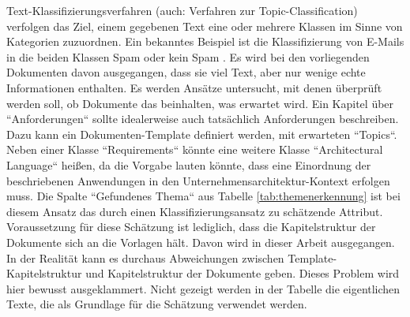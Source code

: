 Text-Klassifizierungsverfahren (auch: Verfahren zur Topic-Classification) verfolgen das Ziel, einem gegebenen Text eine oder mehrere Klassen im Sinne von Kategorien zuzuordnen. Ein bekanntes Beispiel ist die Klassifizierung von E-Mails in die beiden Klassen Spam oder kein Spam \cite{Gupta}. Es wird bei den vorliegenden Dokumenten davon ausgegangen, dass sie viel Text, aber nur wenige echte Informationen enthalten. 
Es werden Ansätze untersucht, mit denen überprüft werden soll, ob Dokumente das beinhalten, was erwartet wird. Ein Kapitel über ``Anforderungen`` sollte idealerweise auch tatsächlich Anforderungen beschreiben.
Dazu kann ein Dokumenten-Template definiert werden, mit erwarteten ``Topics``. Neben einer Klasse ``Requirements`` könnte eine weitere Klasse ``Architectural Language`` heißen, da die Vorgabe lauten könnte, dass eine Einordnung der beschriebenen Anwendungen in den Unternehmensarchitektur-Kontext erfolgen muss. Die Spalte ``Gefundenes Thema`` aus Tabelle \ref{tab:themenerkennung} ist bei diesem Ansatz das durch einen Klassifizierungsansatz zu schätzende Attribut. Voraussetzung für diese Schätzung ist lediglich, dass die Kapitelstruktur der Dokumente sich an die Vorlagen hält. Davon wird in dieser Arbeit ausgegangen. In der Realität kann es durchaus Abweichungen zwischen Template-Kapitelstruktur und Kapitelstruktur der Dokumente geben. Dieses Problem wird hier bewusst ausgeklammert. Nicht gezeigt werden in der Tabelle die eigentlichen Texte, die als Grundlage für die Schätzung verwendet werden. 

